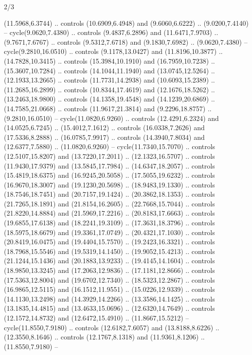 \begin{flagdescription}{2/3}
\begin{scope}[yshift=\flagwidth,scale=\flagwidth/1241.93737]
\begin{scope}[y=-1mm, x=1mm,draw=gold,fill=blue,line join=miter,miter limit=4,line width=1.8\lw]
\begin{scope}[y=1mm, x=1mm, yscale=-1,shift={(573.68mm+\str,145.75)}]
\begin{scope}[scale=1.35,shift={(-9,-3)}]
\begin{scope}[scale=0.55]
\begin{scope}[scale=1.333]
    (11.5968,6.3744) .. controls (10.6909,6.4948) and (9.6060,6.6222) ..
    (9.0200,7.4140) -- cycle(9.0620,7.4380) .. controls (9.4837,6.2896) and
    (11.6471,7.9703) .. (9.7671,7.6767) .. controls (9.5312,7.6718) and
    (9.1830,7.6982) .. (9.0620,7.4380) -- cycle(9.2810,16.0510) .. controls
    (9.1178,13.0427) and (11.8196,10.3877) .. (14.7828,10.3415) .. controls
    (15.3984,10.1910) and (16.7959,10.7238) .. (15.3607,10.7284) .. controls
    (14.1044,11.1940) and (13.0745,12.5264) .. (12.1933,13.2665) .. controls
    (11.7731,14.2938) and (10.6093,15.2389) .. (11.2685,16.2899) .. controls
    (10.8344,17.4619) and (12.1676,18.5262) .. (13.2463,18.9800) .. controls
    (14.1358,19.4548) and (14.1239,20.6869) .. (14.7585,21.0668) .. controls
    (11.9617,21.3814) and (9.2296,18.8757) .. (9.2810,16.0510) --
    cycle(11.0820,6.9260) .. controls (12.4291,6.2324) and (14.0525,6.7245) ..
    (15.4012,7.1612) .. controls (16.0338,7.2626) and (17.5336,8.2888) ..
    (16.0785,7.9917) .. controls (14.3940,7.8034) and (12.6377,7.5880) ..
    (11.0820,6.9260) -- cycle(11.7340,15.7070) .. controls (12.5107,15.8207) and
    (13.7220,17.2011) .. (12.1323,16.5707) .. controls (11.9430,17.9379) and
    (13.5845,17.7984) .. (14.6347,18.2057) .. controls (15.4819,18.6375) and
    (16.9245,20.5058) .. (17.5055,19.6232) .. controls (16.9670,18.3007) and
    (19.1230,20.5698) .. (18.9483,19.1330) .. controls (18.7546,18.7451) and
    (20.7157,19.1424) .. (20.3862,18.1353) .. controls (21.7265,18.1891) and
    (21.8154,16.2605) .. (22.7668,15.7044) .. controls (21.8220,14.8884) and
    (21.5969,17.2216) .. (20.8183,17.6663) .. controls (19.6855,17.6138) and
    (18.2241,19.3109) .. (17.3631,18.3796) .. controls (18.5975,18.6679) and
    (19.3361,17.0749) .. (20.4321,17.1030) .. controls (20.8419,16.0475) and
    (19.4404,15.7570) .. (19.2423,16.3321) .. controls (18.7968,15.5546) and
    (19.5319,14.1450) .. (19.9052,15.4213) .. controls (21.1244,15.1436) and
    (20.1883,13.9233) .. (19.4145,14.1604) .. controls (18.9850,13.3245) and
    (17.2063,12.9836) .. (17.1181,12.8666) .. controls (17.5363,12.8004) and
    (19.6702,12.7340) .. (18.5323,12.2867) .. controls (16.9865,12.5115) and
    (16.1512,11.9551) .. (15.0226,12.9339) .. controls (14.1130,13.2498) and
    (14.3929,14.2266) .. (13.3586,14.1425) .. controls (13.1835,14.4815) and
    (13.4633,15.0696) .. (12.6320,14.7649) .. controls (12.1572,14.8732) and
    (12.6472,15.4910) .. (11.8667,15.5212) -- cycle(11.8550,7.9180) .. controls
    (12.6182,7.6057) and (13.8188,8.6226) .. (12.3550,8.1646) .. controls
    (12.1767,8.1318) and (11.9361,8.1206) .. (11.8550,7.9180) --

\end{scope}
\end{scope}
\end{scope}
\end{scope}
\end{scope}
\end{scope}
\end{flagdescription}
